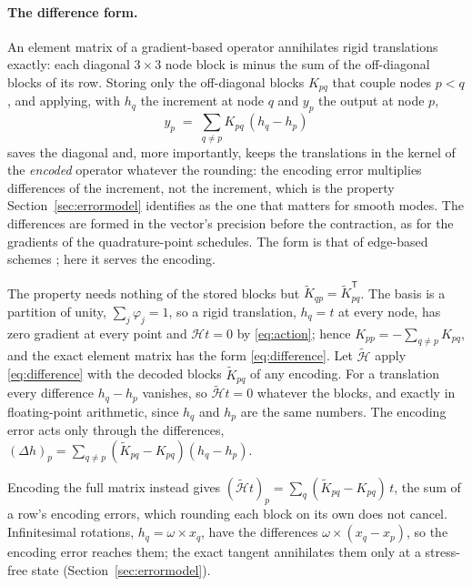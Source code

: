 \documentclass[sigconf,balance=false]{acmart}
\begin{document}
\paragraph{The difference form.}  An element matrix of a gradient-based operator annihilates rigid
translations exactly: each diagonal $3\times3$ node block is minus the sum of the off-diagonal
blocks of its row.  Storing only the off-diagonal blocks $K_{pq}$ that couple nodes $p<q$, and
applying, with $h_q$ the increment at node $q$ and $y_p$ the output at node $p$,
\begin{equation}
  y_p \;=\; \sum_{q\ne p} K_{pq}\,(h_q - h_p)
  \label{eq:difference}
\end{equation}
saves the diagonal and, more importantly, keeps the translations in the kernel of the
\emph{encoded} operator whatever the rounding: the encoding error multiplies differences of the
increment, not the increment, which is the property Section~\ref{sec:errormodel} identifies as the
one that matters for smooth modes.  The differences are formed in the vector's precision before the
contraction, as for the gradients of the quadrature-point schedules.  The form is that of edge-based
schemes \cite{Lohner2008}; here it serves the encoding.

The property needs nothing of the stored blocks but $\tilde K_{qp}=\tilde K_{pq}^{\mathsf T}$.  The
basis is a partition of unity, $\sum_j\varphi_j=1$, so a rigid translation, $h_q=t$ at every node, has
zero gradient at every point and $\mathcal Ht=0$ by \eqref{eq:action}; hence
$K_{pp}=-\sum_{q\ne p}K_{pq}$, and the exact element matrix has the form \eqref{eq:difference}.  Let
$\tilde{\mathcal H}$ apply \eqref{eq:difference} with the decoded blocks $\tilde K_{pq}$ of any
encoding.  For a translation every difference $h_q-h_p$ vanishes, so $\tilde{\mathcal H}t=0$ whatever
the blocks, and exactly in floating-point arithmetic, since $h_q$ and $h_p$ are the same numbers.  The
encoding error acts only through the differences, $(\Delta h)_p=\sum_{q\ne p}(\tilde K_{pq}-K_{pq})
(h_q-h_p)$.

Encoding the full matrix instead gives $(\tilde{\mathcal H}t)_p=\sum_q(\tilde K_{pq}-K_{pq})\,t$,
the sum of a row's encoding errors, which rounding each block on its own does not cancel.
Infinitesimal rotations, $h_q=\omega\times x_q$, have the differences $\omega\times(x_q-x_p)$, so the
encoding error reaches them; the exact tangent annihilates them only at a stress-free state
(Section~\ref{sec:errormodel}).
\end{document}
